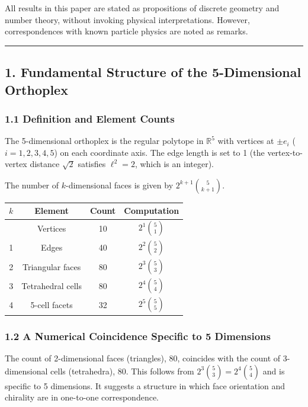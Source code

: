 \documentclass[a4paper,11pt]{article}
\newcounter{none}
\begin{document}
All results in this paper are stated as propositions of discrete geometry and number theory, without invoking physical interpretations. However, correspondences with known particle physics are noted as remarks.

\begin{center}\rule{0.5\linewidth}{0.5pt}\end{center}

\subsection*{1. Fundamental Structure of the 5-Dimensional Orthoplex}

\subsubsection*{1.1 Definition and Element Counts}

The 5-dimensional orthoplex is the regular polytope in $\mathbb{R}^5$ with vertices at $\pm e_i$ ($i = 1, 2, 3, 4, 5$) on each coordinate axis. The edge length is set to 1 (the vertex-to-vertex distance $\sqrt{2}$ satisfies $\ell^2 = 2$, which is an integer).

The number of $k$-dimensional faces is given by $2^{k+1}\binom{5}{k+1}$.

{\def\LTcaptype{none}
\begin{longtable}[]{@{}cccc@{}}
\toprule
$k$ & Element & Count & Computation \\
\midrule
\endhead
\bottomrule
\endlastfoot
0 & Vertices & 10 & $2^1 \binom{5}{1}$ \\
1 & Edges & 40 & $2^2 \binom{5}{2}$ \\
2 & Triangular faces & 80 & $2^3 \binom{5}{3}$ \\
3 & Tetrahedral cells & 80 & $2^4 \binom{5}{4}$ \\
4 & 5-cell facets & 32 & $2^5 \binom{5}{5}$ \\
\end{longtable}
}

\subsubsection*{1.2 A Numerical Coincidence Specific to 5 Dimensions}

The count of 2-dimensional faces (triangles), 80, coincides with the count of 3-dimensional cells (tetrahedra), 80. This follows from $2^3 \binom{5}{3} = 2^4 \binom{5}{4}$ and is specific to 5 dimensions. It suggests a structure in which face orientation and chirality are in one-to-one correspondence.
\end{document}
